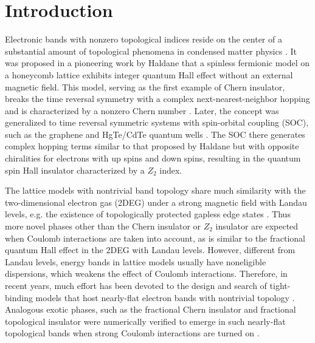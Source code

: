 \documentclass[amsmath,superscriptaddress,showpacs,aps,prb,twocolumn]{revtex4-1}
\begin{document}
\section{Introduction}
\par Electronic bands with nonzero topological indices reside on the center of a substantial amount of topological phenomena in condensed matter physics \cite{HK_RMP2010,QZ_RMP2011}. It was proposed in a pioneering work by Haldane \cite{H_PRL1988} that a spinless fermionic model on a honeycomb lattice exhibits integer quantum Hall effect \cite{KDP_PRL1980} without an external magnetic field. This model, serving as the first example of Chern insulator, breaks the time reversal symmetry with a complex next-nearest-neighbor hopping and is characterized by a nonzero Chern number \cite{TKNN_PRL1982}. Later, the concept was generalized to time reversal symmetric systems with spin-orbital coupling (SOC), such as the graphene \cite{KM_PRL2005a,KM_PRL2005b} and HgTe/CdTe quantum wells \cite{BHZ_S2006,Ketc_S2007}. The SOC there generates complex hopping terms similar to that proposed by Haldane but with opposite chiralities for electrons with up spins and down spins, resulting in the quantum spin Hall insulator characterized by a $Z_2$ index.

\par The lattice models with nontrivial band topology share much similarity with the two-dimensional electron gas (2DEG) under a strong magnetic field with Landau levels, e.g. the existence of topologically protected gapless edge states \cite{H_PRL1988,L_PRB1981,H_PRB1982,KM_PRL2005a,KM_PRL2005b,BHZ_S2006,Ketc_S2007,YXL_PRL2011,LYGL_PRB2016,LGLW_NJP2017}. Thus more novel phases other than the Chern insulator or $Z_2$ insulator are expected when Coulomb interactions are taken into account, as is similar to the fractional quantum Hall effect \cite{TSG_PRL1982,L_PRL1983} in the 2DEG with Landau levels. However, different from Landau levels, energy bands in lattice models usually have noneligible dispersions, which weakens the effect of Coulomb interactions. Therefore, in recent years, much effort has been devoted to the design and search of tight-binding models that host nearly-flat electron bands with nontrivial topology \cite{TMW_PRL2011,WR_PRB2011,SGKD_PRL2011,WGGS_PRL2011,NSCM_PRL2011,TB_PRB2012,YGSD_PRB2012}. Analogous exotic phases, such as the fractional Chern insulator and fractional topological insulator were numerically verified to emerge in such nearly-flat topological bands when strong Coulomb interactions are turned on \cite{NSCM_PRL2011,SGSS_NC2011,RB_PRX2011,NSRCM_PRB2011,LBFL_PRL2012}.
\end{document}
